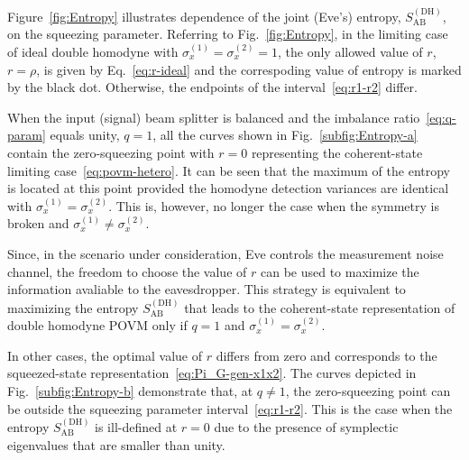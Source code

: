 \documentclass[%
reprint,
superscriptaddress,
 amsmath,amssymb,amsfonts,
 aps,
 pra,
 longbibliography
]{revtex4-2}
\newcommand{\ind}[1]{\mathrm{#1}}
\begin{document}

Figure~\ref{fig:Entropy}
illustrates dependence of the joint (Eve's) entropy,
$S_{\ind{AB}}^{(\ind{DH})}$,
on the squeezing parameter.
Referring to Fig.~\ref{fig:Entropy},
in the limiting case of ideal double homodyne with
$\sigma_x^{(1)}=\sigma_x^{(2)}=1$,
the only allowed value
of $r$, $r=\rho$, is given by Eq.~\eqref{eq:r-ideal}
and the correspoding value of entropy is marked by the black dot.
Otherwise, the endpoints of the interval~\eqref{eq:r1-r2} differ.

When the input (signal) beam splitter is balanced and
the imbalance ratio~\eqref{eq:q-param} equals unity,
$q=1$,
all the curves shown in Fig.~\ref{subfig:Entropy-a}
contain the zero-squeezing point with $r=0$
representing the coherent-state limiting case~\eqref{eq:povm-hetero}.
It can be seen that the maximum of the entropy
is located at this point
provided the homodyne detection variances
are identical with
$\sigma_x^{(1)}=\sigma_x^{(2)}$.
This is, however, no longer the case when the symmetry is broken
and $\sigma_x^{(1)}\ne\sigma_x^{(2)}$.

Since, in the scenario under consideration,
Eve controls the measurement noise channel,
the freedom to choose the value of $r$
can be used to maximize the information avaliable to
the eavesdropper. This strategy is equivalent to
maximizing the entropy $S_{\ind{AB}}^{(\ind{DH})}$
that leads to the coherent-state representation
of double homodyne POVM only if
$q=1$ and $\sigma_x^{(1)}=\sigma_x^{(2)}$.

In other cases, the optimal value of $r$ differs  from zero and corresponds to
the squeezed-state representation~\eqref{eq:Pi_G-gen-x1x2}.
The curves depicted in
Fig.~\ref{subfig:Entropy-b}
demonstrate that, at $q\ne 1$, the zero-squeezing point
can be outside the squeezing parameter interval~\eqref{eq:r1-r2}.
This is the case when the entropy $S_{\ind{AB}}^{(\ind{DH})}$
is ill-defined at $r=0$
due to the presence of symplectic eigenvalues that are smaller than unity.

\end{document}
